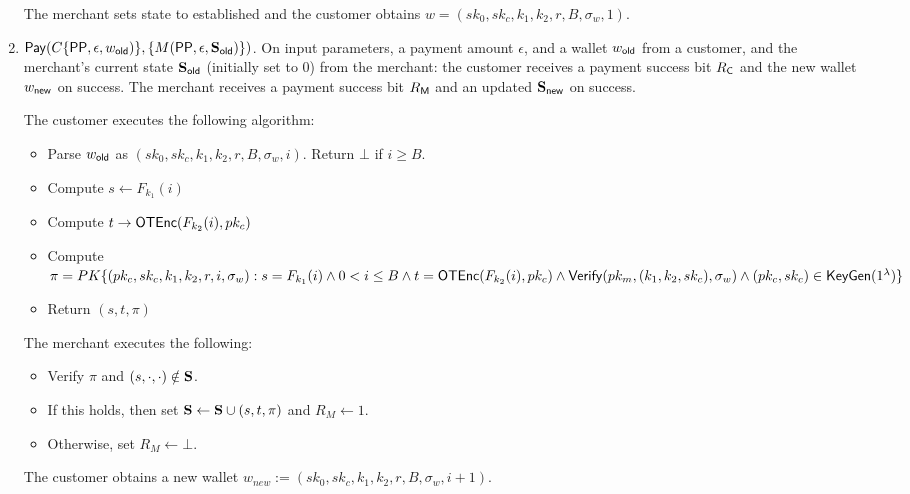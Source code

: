 \documentclass[11pt]{report}
\begin{document}
\begin{enumerate}
\noindent
The merchant sets state to {\sf established} and the customer obtains $w = (sk_0, sk_c, k_1, k_2, r, B, \sigma_w, 1)$.

\item ${\sf Pay}( C\{{\sf PP}, \epsilon, w_{\sf old})\}, \{M({\sf PP}, \epsilon, {\bf S}_{\sf old})\})$. On input parameters, a payment amount $\epsilon$, and a wallet $w_{\sf old}$ from a customer, and the merchant's current state ${\bf S}_{\sf old}$ (initially set to $0$) from the merchant: the customer receives a payment success bit $R_{\sf C}$ and the new wallet $w_{\sf new}$ on success. The merchant receives a payment success bit $R_{\sf M}$ and an updated ${\bf S}_{\sf new}$ on success.

\medskip \noindent
The customer executes the following algorithm:
\begin{itemize}
\item Parse $w_{\sf old}$ as $(sk_0, sk_c, k_1, k_2, r, B, \sigma_w, i)$. Return $\bot$ if $i \geq B$.
\item Compute $s \leftarrow F_{k_1}(i)$
\item Compute $t \rightarrow {\sf OTEnc}(F_{k_2}(i), pk_c)$
\item Compute $\pi = PK\{ (pk_c, sk_c, k_1, k_2, r, i, \sigma_w): s = F_{k_1}(i) \wedge 0 < i \leq B\\  \wedge t = {\sf OTEnc}(F_{k_2}(i), pk_c) \\ \wedge {\sf Verify}(pk_m, (k_1, k_2, sk_c), \sigma_w) \\ \wedge (pk_c, sk_c) \in {\sf KeyGen}(1^\lambda) \}$

\item Return $(s, t, \pi)$
\end{itemize}

\medskip \noindent
The merchant executes the following:
\begin{itemize}
\item Verify $\pi$ and $(s,\cdot, \cdot) \notin {\bf S}$.
\item If this holds, then set ${\bf S} \leftarrow {\bf S}  \cup (s, t, \pi)$ and $R_{M} \leftarrow 1$.
\item Otherwise, set $R_{M} \leftarrow \bot$.
\end{itemize}

\medskip \noindent
The customer obtains a new wallet $w_{new} := (sk_0, sk_c, k_1, k_2, r, B, \sigma_w, i+1)$.


\end{enumerate}
\end{document}
